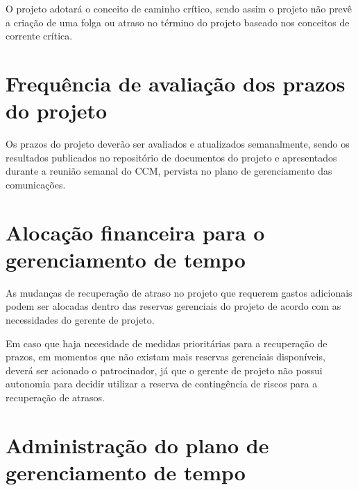 O projeto adotará o conceito de caminho crítico, sendo assim o projeto não prevê a criação de uma folga ou atraso no término do projeto baseado nos conceitos de corrente crítica.



\section{Frequência de avaliação dos prazos do projeto}

Os prazos do projeto deverão ser avaliados e atualizados semanalmente, sendo os resultados publicados no repositório de documentos do projeto e apresentados durante a reunião semanal do CCM, pervista no plano de gerenciamento das comunicações.

\section{Alocação financeira para o gerenciamento de tempo}

As mudanças de recuperação de atraso no projeto que requerem gastos adicionais podem ser alocadas dentro das reservas gerenciais do projeto de acordo com as necessidades do gerente de projeto.

Em caso que haja necesidade de medidas prioritárias para a recuperação de prazos, em momentos que não existam mais reservas gerenciais disponíveis, deverá ser acionado o patrocinador, já que o gerente de projeto não possui autonomia para decidir utilizar a reserva de contingência de riscos para a recuperação de atrasos.

\section{Administração do plano de gerenciamento de tempo}

